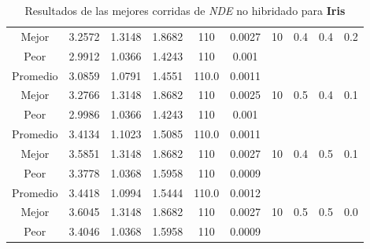 \begin{table}[h!]
\begin{center}
\begin{tabular}{|c|c|c|c|c|c|c|c|c|c|}
            \cline{1-6}
            Mejor & 3.2572 & 1.3148  & 1.8682 & 110 & 0.0027 & 10 & 0.4 & 0.4 & 0.2\\
            \cline{1-6}
            Peor & 2.9912 & 1.0366  & 1.4243 & 110 & 0.001 &  &  &  & \\
        \hline
        \hline
            Promedio  & 3.0859 & 1.0791 & 1.4551 & 110.0 & 0.0011 &  &  &  & \\
            \cline{1-6}
            Mejor & 3.2766 & 1.3148  & 1.8682 & 110 & 0.0025 & 10 & 0.5 & 0.4 & 0.1\\
            \cline{1-6}
            Peor & 2.9986 & 1.0366  & 1.4243 & 110 & 0.001 &  &  &  & \\
        \hline
        \hline
            Promedio  & 3.4134 & 1.1023 & 1.5085 & 110.0 & 0.0011 &  &  &  & \\
            \cline{1-6}
            Mejor & 3.5851 & 1.3148  & 1.8682 & 110 & 0.0027 & 10 & 0.4 & 0.5 & 0.1\\
            \cline{1-6}
            Peor & 3.3778 & 1.0368  & 1.5958 & 110 & 0.0009 &  &  &  & \\
        \hline
        \hline
            Promedio  & 3.4418 & 1.0994 & 1.5444 & 110.0 & 0.0012 &  &  &  & \\
            \cline{1-6}
            Mejor & 3.6045 & 1.3148  & 1.8682 & 110 & 0.0027 & 10 & 0.5 & 0.5 & 0.0\\
            \cline{1-6}
            Peor & 3.4046 & 1.0368  & 1.5958 & 110 & 0.0009 &  &  &  & \\
        \hline
        \end{tabular}
        \caption{Resultados de las mejores corridas de \emph{NDE} no hibridado para {\bf Iris}}
        \label{tb:tabledealgcsv}
    \end{center}
\end{table}



